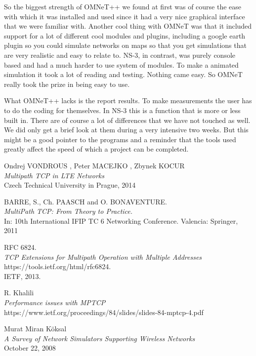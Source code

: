\documentclass[11pt,twocolumn]{article}
\begin{document}
So the biggest strength of OMNeT++ we found at first was of course the ease with which it was installed and used since it had a very nice graphical interface that we were familiar with. Another cool thing with OMNeT was that it included support for a lot of different cool modules and plugins, including a google earth plugin so you could simulate networks on maps so that you get simulations that are very realistic and easy to relate to. NS-3, in contrast, was purely console based and had a much harder to use system of modules. To make a animated simulation it took a lot of reading and testing. Nothing came easy. So OMNeT really took the prize in being easy to use.

What OMNeT++ lacks is the report results. To make measurements the user has to do the coding for themselves. In NS-3 this is a function that is more or less built in. There are of course a lot of differences that we have not touched as well. We did only get a brief look at them during a very intensive two weeks. But this might be a good pointer to the programs and a reminder that the tools used greatly affect the speed of which a project can be completed.

\newpage

\begin{thebibliography}{9}

Ondrej VONDROUS , Peter MACEJKO , Zbynek KOCUR \\
\emph{Multipath TCP in LTE Networks}\\
Czech Technical University in Prague, 2014

BARRE, S., Ch. PAASCH and O. BONAVENTURE.\\
\emph{MultiPath TCP: From Theory to Practice.}\\
In: 10th International IFIP TC 6 Networking
Conference. Valencia: Springer, 2011

RFC 6824.  \\
\emph{TCP Extensions for Multipath Operation with Multiple Addresses} \\ 
https://tools.ietf.org/html/rfc6824.\\ IETF, 2013.

R. Khalili\\
\emph{Performance issues with MPTCP}\\
https://www.ietf.org/proceedings/84/slides/slides-84-mptcp-4.pdf



Murat Miran Köksal\\
\emph{A Survey of Network Simulators Supporting Wireless Networks} \\
October 22, 2008



\end{thebibliography}
\end{document}
